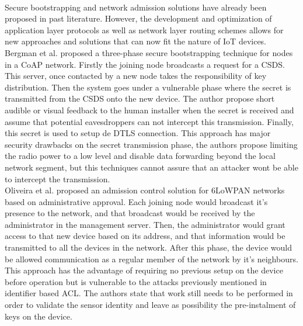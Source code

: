 \paragraph{}
Secure bootstrapping and network admission solutions have already been proposed in past literature. However, the development and optimization of application layer protocols as well as network layer routing schemes allows for new approaches and solutions that can now fit the nature of \ac{IoT} devices.
Bergman et al. \cite{Bergmann2012} proposed a three-phase secure bootstrapping technique for nodes in a \ac{CoAP} network. Firstly the joining node broadcasts a request for a \ac{CSDS}. This server, once contacted by a new node takes the responsibility of key distribution. Then the system goes under a vulnerable phase where the secret is transmitted from the \ac{CSDS} onto the new device. The author propose short audible or visual feedback to the human installer when the secret is received and assume that potential eavesdroppers can not intercept this transmission. Finally, this secret is used to setup de \ac{DTLS} connection. This approach has major security drawbacks on the secret transmission phase, the authors propose limiting the radio power to a low level and disable data forwarding beyond the local network segment, but this techniques cannot assure that an attacker wont be able to intercept the transmission.\\
Oliveira et al. \cite{Oliveira2013} proposed an admission control solution for 6LoWPAN networks based on administrative approval. Each joining node would broadcast it's presence to the network, and that broadcast would be received by the administrator in the management server. Then, the administrator would grant access to that new device based on its address, and that information would be transmitted to all the devices in the network. After this phase, the device would be allowed communication as a regular member of the network by it's neighbours. This approach has the advantage of requiring no previous setup on the device before operation but is vulnerable to the attacks previously mentioned in identifier based \ac{ACL}. The authors state that work still needs to be performed in order to validate the sensor identity and leave as possibility the pre-instalment of keys on the device. 